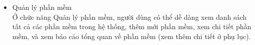 \begin{itemize}

\item{Quản lý phần mềm}\\
Ở chức năng Quản lý phần mềm, người dùng có thể dễ dàng xem danh sách tất cả các phần mềm trong hệ thống, thêm mới phần mềm, xem chi tiết phần mềm, và xem báo cáo tổng quan về phần mềm (xem thêm chi tiết ở phụ lục).


\end{itemize}

